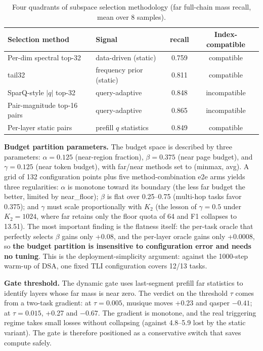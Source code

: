\documentclass[11pt]{article}
\begin{document}
\begin{table}[h]\centering
\caption{Four quadrants of subspace selection methodology (far full-chain mass recall, mean over 8 samples).}
\label{tab:select}
\begin{tabular}{llcc}
\toprule
Selection method & Signal & recall & Index-compatible \\
\midrule
Per-dim spectral top-32 & data-driven (static) & 0.759 & compatible \\
tail32 & frequency prior (static) & 0.811 & compatible \\
SparQ-style $|q|$ top-32 & query-adaptive & 0.848 & incompatible \\
Pair-magnitude top-16 pairs & query-adaptive & 0.865 & incompatible \\
Per-layer static pairs & prefill $q$ statistics & 0.849 & compatible \\
\bottomrule
\end{tabular}
\end{table}

\textbf{Budget partition parameters.} The budget space is described by three parameters: $\alpha{=}0.125$ (near-region fraction), $\beta{=}0.375$ (near page budget), and $\gamma{=}0.125$ (near token budget), with far/near methods set to (minmax, avg). A grid of 132 configuration points plus five method-combination e2e arms yields three regularities: $\alpha$ is monotone toward its boundary (the less far budget the better, limited by near\_floor); $\beta$ is flat over 0.25--0.75 (multi-hop tasks favor 0.375); and $\gamma$ must scale proportionally with $K_2$ (the lesson of $\gamma{=}0.5$ under $K_2{=}1024$, where far retains only the floor quota of 64 and F1 collapses to 13.51). The most important finding is the flatness itself: the per-task oracle that perfectly selects $\beta$ gains only +0.08, and the per-layer oracle gains only +0.0008, so \textbf{the budget partition is insensitive to configuration error and needs no tuning}. This is the deployment-simplicity argument: against the 1000-step warm-up of DSA, one fixed TLI configuration covers 12/13 tasks.

\textbf{Gate threshold.} The dynamic gate uses last-segment prefill far statistics to identify layers whose far mass is near zero. The verdict on the threshold $\tau$ comes from a two-task gradient: at $\tau{=}0.005$, musique moves +0.23 and qasper $-0.41$; at $\tau{=}0.015$, +0.27 and $-0.67$. The gradient is monotone, and the real triggering regime takes small losses without collapsing (against 4.8--5.9 lost by the static variant). The gate is therefore positioned as a conservative switch that saves compute safely.
\end{document}
